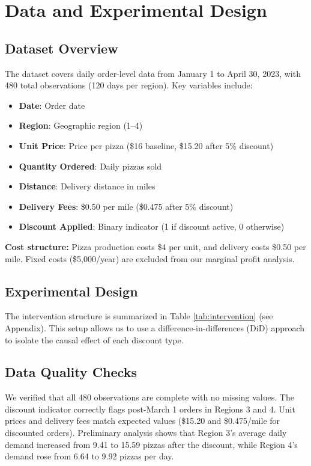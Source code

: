 \documentclass[12pt]{article}
\begin{document}
\section{Data and Experimental Design}

\subsection{Dataset Overview}

The dataset covers daily order-level data from January 1 to April 30, 2023, with 480 total observations (120 days per region). Key variables include:

\begin{itemize}[nosep]
    \item \textbf{Date}: Order date
    \item \textbf{Region}: Geographic region (1--4)
    \item \textbf{Unit Price}: Price per pizza (\$16 baseline, \$15.20 after 5\% discount)
    \item \textbf{Quantity Ordered}: Daily pizzas sold
    \item \textbf{Distance}: Delivery distance in miles
    \item \textbf{Delivery Fees}: \$0.50 per mile (\$0.475 after 5\% discount)
    \item \textbf{Discount Applied}: Binary indicator (1 if discount active, 0 otherwise)
\end{itemize}

\textbf{Cost structure:} Pizza production costs \$4 per unit, and delivery costs \$0.50 per mile. Fixed costs (\$5,000/year) are excluded from our marginal profit analysis.

\subsection{Experimental Design}

The intervention structure is summarized in Table \ref{tab:intervention} (see Appendix). This setup allows us to use a difference-in-differences (DiD) approach to isolate the causal effect of each discount type.

\subsection{Data Quality Checks}

We verified that all 480 observations are complete with no missing values. The discount indicator correctly flags post-March 1 orders in Regions 3 and 4. Unit prices and delivery fees match expected values (\$15.20 and \$0.475/mile for discounted orders). Preliminary analysis shows that Region 3's average daily demand increased from 9.41 to 15.59 pizzas after the discount, while Region 4's demand rose from 6.64 to 9.92 pizzas per day.
\end{document}
